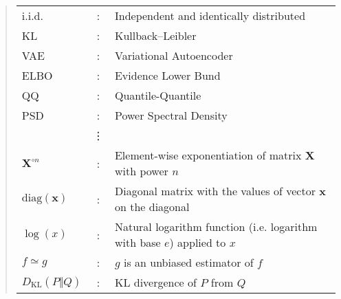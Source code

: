 \documentclass[ oneside,%
                    author={George Herbert},
                    degree={MSci},
                     title={Diffusion Models for Time-Evolving Precipitation Fields},
                  subtitle={}]{dissertation}
\begin{document}
\begin{quote}
\noindent
\begin{tabular}{lcl}
      i.i.d. &: & Independent and identically distributed\\
      KL &: & Kullback--Leibler\\
      VAE &: & Variational Autoencoder\\
      ELBO &: & Evidence Lower Bund\\
      QQ &: & Quantile-Quantile\\
      PSD &: & Power Spectral Density\\
      &\vdots&\\
      $\mathbf{X}^{\circ n}$ &: & Element-wise exponentiation of matrix $\mathbf{X}$ with power $n$\\
      $\mathrm{diag}(\mathbf{x})$ &: & Diagonal matrix with the values of vector $\mathbf{x}$ on the diagonal\\
      $\log(x)$ &: & Natural logarithm function (i.e. logarithm with base $e$) applied to $x$\\
      $f\simeq g$ &: & $g$ is an unbiased estimator of $f$\\
      $D_{\mathrm{KL}}(P\Vert Q)$ &: & KL divergence of $P$ from $Q$\\

\end{tabular}
\end{quote}


\end{document}
